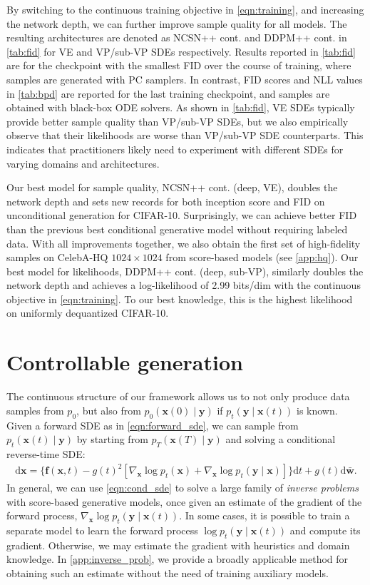 \documentclass{article} \usepackage{iclr2021_conference,times}
\newcommand{\ud}{\mathrm{d}}
\newcommand{\bfx}{\mathbf{x}}
\newcommand{\bfw}{\mathbf{w}}
\newcommand{\bff}{\mathbf{f}}
\newcommand{\bfy}{\mathbf{y}}
\begin{document}
By switching to the continuous training objective in \cref{eqn:training}, and increasing the network depth, we can further improve sample quality for all models. The resulting architectures are denoted as NCSN++ cont. and DDPM++ cont. in \cref{tab:fid} for VE and VP/sub-VP SDEs respectively. Results reported in \cref{tab:fid} are for the checkpoint with the smallest FID over the course of training, where samples are generated with PC samplers. In contrast, FID scores and NLL values in \cref{tab:bpd} are reported for the last training checkpoint, and samples are obtained with black-box ODE solvers. As shown in \cref{tab:fid}, VE SDEs typically provide better sample quality than VP/sub-VP SDEs, but we also empirically observe that their likelihoods are worse than VP/sub-VP SDE counterparts. This indicates that practitioners likely need to experiment with different SDEs for varying domains and architectures.

Our best model for sample quality, NCSN++ cont. (deep, VE), doubles the network depth and sets new records for both inception score and FID on unconditional generation for CIFAR-10. Surprisingly, we can achieve better FID than the previous best conditional generative model without requiring labeled data. With all improvements together, we also obtain the first set of high-fidelity samples on CelebA-HQ $1024\times 1024$ from score-based models (see \cref{app:hq}). Our best model for likelihoods, DDPM++ cont. (deep, sub-VP), similarly doubles the network depth and achieves a log-likelihood of 2.99 bits/dim with the continuous objective in \cref{eqn:training}. To our best knowledge, this is the highest likelihood on uniformly dequantized CIFAR-10.

 \section{Controllable generation}
The continuous structure of our framework allows us to not only produce data samples from $p_0$, but also from $p_0(\bfx(0) \mid \bfy)$ if $p_t(\bfy \mid \bfx(t))$ is known. Given a forward SDE as in \cref{eqn:forward_sde}, we can sample from $p_t(\bfx(t) \mid \bfy)$ by starting from $p_T(\bfx(T) \mid \bfy)$ and solving a conditional reverse-time SDE:
\begin{align}
\ud \bfx = \{\bff(\bfx, t) - g(t)^2[ \nabla_\bfx  \log p_t(\bfx)+  \nabla_{\bfx}  \log p_t(\bfy \mid \bfx)]\} \ud t + g(t) \ud \bar{\bfw}.\label{eqn:cond_sde}
\end{align}
In general, we can use \cref{eqn:cond_sde} to solve a large family of \emph{inverse problems} with score-based generative models, once given an estimate of the gradient of the forward process, $\nabla_\bfx \log p_t(\bfy \mid \bfx(t) )$. In some cases, it is possible to train a separate model to learn the forward process $\log p_t(\bfy \mid \bfx(t))$ and compute its gradient. Otherwise, we may estimate the gradient with heuristics and domain knowledge. In \cref{app:inverse_prob}, we provide a broadly applicable method for obtaining such an estimate without the need of training auxiliary models.
\end{document}
